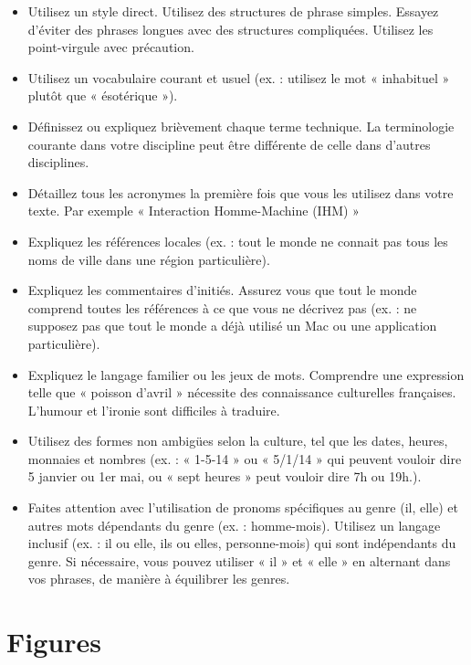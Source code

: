 \documentclass{chi-ext}
\begin{document}
\begin{itemize}\compresslist
\item 	
Utilisez un style direct.
Utilisez des structures de phrase simples.
Essayez d'éviter des phrases longues avec des structures compliquées.
Utilisez les point-virgule avec précaution.
\item 	
Utilisez un vocabulaire courant et usuel (ex. : utilisez le mot « inhabituel » plutôt que « ésotérique »).
\item 	
Définissez ou expliquez brièvement chaque terme technique.
La terminologie courante dans votre discipline peut être différente de celle dans d'autres disciplines.
\item 	
Détaillez tous les acronymes la première fois que vous les utilisez dans votre texte.
Par exemple « Interaction Homme-Machine (IHM) »
\item 	
Expliquez les références locales (ex. : tout le monde ne connait pas tous les noms de ville dans une région particulière).
\item 	
Expliquez les commentaires d'initiés.
Assurez vous que tout le monde comprend toutes les références à ce que vous ne décrivez pas (ex. : ne supposez pas que tout le monde a déjà utilisé un Mac ou une application particulière).
\item 	
Expliquez le langage familier ou les jeux de mots.
Comprendre une expression telle que « poisson d'avril » nécessite des connaissance culturelles françaises.
L'humour et l'ironie sont difficiles à traduire.
\item 	
Utilisez des formes non ambigües selon la culture, tel que les dates, heures, monnaies et nombres (ex. : « 1-5-14 » ou « 5/1/14 » qui peuvent vouloir dire 5 janvier ou 1er mai, ou « sept heures » peut vouloir dire 7h ou 19h.).
\item 	
Faites attention avec l'utilisation de pronoms spécifiques au genre (il, elle) et autres mots dépendants du genre (ex. : homme-mois).
Utilisez un langage inclusif (ex. : il ou elle, ils ou elles, personne-mois) qui sont indépendants du genre.
Si nécessaire, vous pouvez utiliser « il » et « elle » en alternant dans vos phrases, de manière à équilibrer les genres. 
\end{itemize}


\section{Figures}
\end{document}
